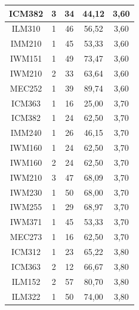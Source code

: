 \documentclass[12pt]{article}
\begin{document}
\begin{table}[H]
{{\begin{minipage}[b]{.5\hsize}
{\begin{tabular}{|c|c|c|c|c|}
            \rowcolor[HTML]{DAEBFB} 
            ICM382 & 3 & 34 & 44,12 & 3,60 \\ \hline
            \rowcolor[HTML]{DAEBFB} 
            ILM310 & 1 & 46 & 56,52 & 3,60 \\ \hline
            \rowcolor[HTML]{DAEBFB} 
            IMM210 & 1 & 45 & 53,33 & 3,60 \\ \hline
            \rowcolor[HTML]{DAEBFB} 
            IWM151 & 1 & 49 & 73,47 & 3,60 \\ \hline
            \rowcolor[HTML]{DAEBFB} 
            IWM210 & 2 & 33 & 63,64 & 3,60 \\ \hline
            \rowcolor[HTML]{DAEBFB} 
            MEC252 & 1 & 39 & 89,74 & 3,60 \\ \hline
            \rowcolor[HTML]{DAEBFB} 
            ICM363 & 1 & 16 & 25,00 & 3,70 \\ \hline
            \rowcolor[HTML]{DAEBFB} 
            ICM382 & 1 & 24 & 62,50 & 3,70 \\ \hline
            \rowcolor[HTML]{DAEBFB} 
            IMM240 & 1 & 26 & 46,15 & 3,70 \\ \hline
            \rowcolor[HTML]{DAEBFB} 
            IWM160 & 1 & 24 & 62,50 & 3,70 \\ \hline
            \rowcolor[HTML]{DAEBFB} 
            IWM160 & 2 & 24 & 62,50 & 3,70 \\ \hline
            \rowcolor[HTML]{DAEBFB} 
            IWM210 & 3 & 47 & 68,09 & 3,70 \\ \hline
            \rowcolor[HTML]{DAEBFB} 
            IWM230 & 1 & 50 & 68,00 & 3,70 \\ \hline
            \rowcolor[HTML]{DAEBFB} 
            IWM255 & 1 & 29 & 68,97 & 3,70 \\ \hline
            \rowcolor[HTML]{DAEBFB} 
            IWM371 & 1 & 45 & 53,33 & 3,70 \\ \hline
            \rowcolor[HTML]{DAEBFB} 
            MEC273 & 1 & 16 & 62,50 & 3,70 \\ \hline
            \rowcolor[HTML]{DAEBFB} 
            ICM312 & 1 & 23 & 65,22 & 3,80 \\ \hline
            \rowcolor[HTML]{DAEBFB} 
            ICM363 & 2 & 12 & 66,67 & 3,80 \\ \hline
            \rowcolor[HTML]{DAEBFB} 
            ILM152 & 2 & 57 & 80,70 & 3,80 \\ \hline
            \rowcolor[HTML]{DAEBFB} 
            ILM322 & 1 & 50 & 74,00 & 3,80 \\ \hline

\end{tabular}}
\end{minipage}}}
\end{table}
\end{document}
